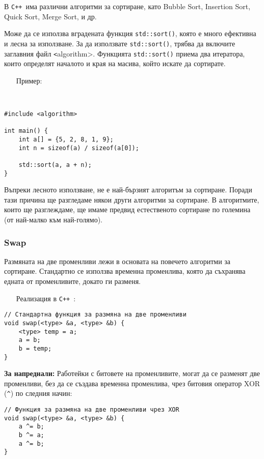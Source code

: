 \documentclass[oneside]{book}
\newcommand*{\code}[1]{\texttt{#1}}
\newcommand*{\cpp}{\texttt{C++}\ }
\begin{document}
В \cpp има различни алгоритми за сортиране, като Bubble Sort, Insertion Sort, Quick Sort, Merge Sort, и др.

Може да се използва вградената функция \code{std::sort()}, която е много ефективна и лесна за използване.
За да използвате \code{std::sort()}, трябва да включите заглавния файл \code<algorithm>.
Функцията \code{std::sort()} приема два итератора, които определят началото и края на масива, който искате да сортирате.

\begin{itemize}\item[Пример:]\end{itemize}\
\begin{mdframed}\begin{lstlisting}
#include <algorithm>

int main() {
    int a[] = {5, 2, 8, 1, 9};
    int n = sizeof(a) / sizeof(a[0]);

    std::sort(a, a + n);
}
\end{lstlisting}\end{mdframed}

Въпреки лесното използване, не е най-бързият алгоритъм за сортиране. Поради тази причина ще разгледаме някои други алгоритми за сортиране. В алгоритмите, които ще разглеждаме, ще имаме предвид естественото сортиране по големина (от най-малко към най-голямо).
\pagebreak
\subsubsection{Swap}
Размяната на две променливи лежи в основата на повечето алгоритми за сортиране. Стандартно се използва временна променлива, която да съхранява едната от променливите, докато ги разменя.

\begin{itemize}\item[Реализация] в \cpp:\end{itemize}
\begin{mdframed}\begin{lstlisting}
// Стандартна функция за размяна на две променливи
void swap(<type> &a, <type> &b) {
    <type> temp = a;
    a = b;
    b = temp;
}
\end{lstlisting}\end{mdframed}

\textbf{За напреднали:} Работейки с битовете на променливите, могат да се разменят две променливи, без да се създава временна променлива, чрез битовия оператор XOR (\code{\^}) по следния начин:
\begin{mdframed}\begin{lstlisting}
// Функция за размяна на две променливи чрез XOR
void swap(<type> &a, <type> &b) {
    a ^= b;
    b ^= a;
    a ^= b;
}
\end{lstlisting}\end{mdframed}
\end{document}
